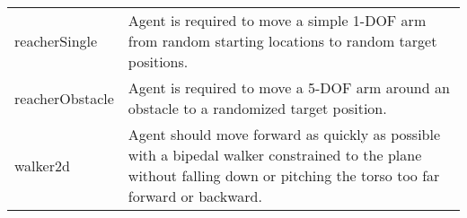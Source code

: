 \documentclass{article} \usepackage{iclr2016_conference,times}
\begin{document}
\begin{center}
\begin{longtable}{ l | p{10cm} }
reacherSingle                & Agent is required to move a simple 1-DOF arm from random starting locations to random target positions. \\
reacherObstacle              & Agent is required to move a 5-DOF arm around an obstacle to a randomized target position. \\
walker2d                     & Agent should move forward as quickly as possible with a bipedal walker constrained to the plane without falling down or pitching the torso too far forward or backward. \\
\end{longtable}
\end{center}
\end{document}
